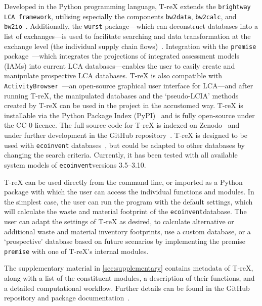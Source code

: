 \documentclass[a4paper,fleqn]{cas-dc}
\begin{document}
Developed in the Python programming language, T-reX extends the
\texttt{brightway LCA framework}, utilising especially the components
\texttt{bw2data}, \texttt{bw2calc}, and
\texttt{bw2io}~\citep{mutel2017brightway}. Additionally, the \texttt{wurst}
package---which can deconstruct databases into a list of exchanges---is used to
facilitate searching and data transformation at the exchange level (the
individual supply chain flows)~\citep{mutel2017wurst}. Integration with the
\texttt{premise} package~\citep{sacchi2022premise}---which integrates the
projections of integrated assessment models (IAMs) into current LCA
databases---enables the user to easily create and manipulate prospective LCA
databases. T-reX is also compatible with
\texttt{ActivityBrowser}~\citep{steubing2020activitybrowser}---an open-source
graphical user interface for LCA---and after running T-reX, the manipulated
databases and the `pseudo-LCIA' methods created by T-reX can be used in the
project in the accustomed way. T-reX is installable via the Python Package
Index (PyPI)~\citep{mcdowall2023T-reXpipy} and is fully open-source under the
CC-0 licence. The full source code for T-reX is indexed on
Zenodo~\citep{mcdowall2023T-reXzenodo} and under further development in the
GitHub repository~\citep{mcdowall2024T-reXgithub}. T-reX is designed to be used
with \texttt{ecoinvent} databases~\citep{ecoinvent2016version3}, but could be
adapted to other databases by changing the search criteria. Currently, it has
been tested with all available system models of \texttt{ecoinvent}versions
3.5--3.10.

T-reX can be used directly from the command line, or imported as a Python
package with which the user can access the individual functions and modules. In
the simplest case, the user can run the program with the default settings,
which will calculate the waste and material footprint of the
\texttt{ecoinvent}database. The user can adapt the settings of T-reX as
desired, to calculate alternative or additional waste and material inventory
footprints, use a custom database, or a `prospective' database based on future
scenarios by implementing the premise \texttt{premise} with one of T-reX's
internal modules.

The supplementary material in \autoref{sec:supplementary} contains metadata of
T-reX, along with a list of the constituent modules, a description of their
functions, and a detailed computational workflow. Further details can be found
in the GitHub repository and package documentation~\citep{mcdowall2024T-reXgithub, mcdowall2023T-reXdocs}.
\end{document}
